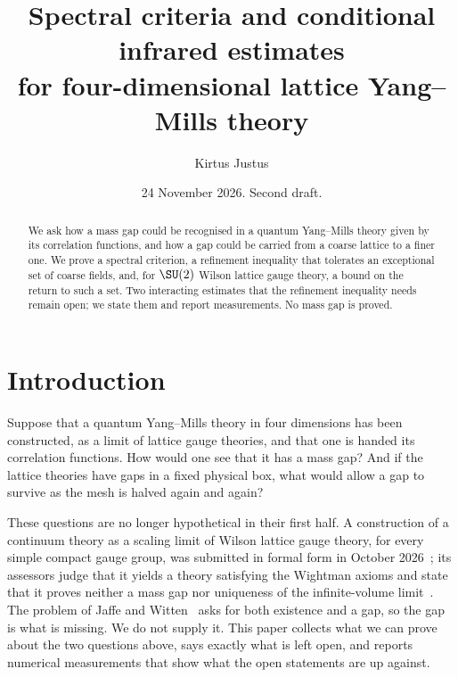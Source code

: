 
\usepackage{tikz}
\usetikzlibrary{positioning,arrows.meta}
\title[Spectral criteria and conditional infrared estimates]{Spectral criteria and conditional infrared estimates\\ for four-dimensional lattice Yang--Mills theory}
\author{Kirtus Justus}
\address{Theoretical Physicist, Port Coquitlam, British Columbia, Canada}
\date{24 November 2026. Second draft.}

\begin{abstract}
We ask how a mass gap could be recognised in a quantum Yang--Mills theory given by its correlation functions,
and how a gap could be carried from a coarse lattice to a finer one. We prove a spectral criterion, a
refinement inequality that tolerates an exceptional set of coarse fields, and, for $\SU(2)$ Wilson lattice
gauge theory, a bound on the return to such a set. Two interacting estimates that the refinement inequality
needs remain open; we state them and report measurements. No mass gap is proved.
\end{abstract}
\maketitle
\tableofcontents

\section{Introduction}\label{s:intro}

Suppose that a quantum Yang--Mills theory in four dimensions has been constructed, as a limit of lattice
gauge theories, and that one is handed its correlation functions. How would one see that it has a mass gap?
And if the lattice theories have gaps in a fixed physical box, what would allow a gap to survive as the mesh is
halved again and again?

These questions are no longer hypothetical in their first half. A construction of a continuum theory as a
scaling limit of Wilson lattice gauge theory, for every simple compact gauge group, was submitted in formal
form in October 2026~\cite{OAI}; its assessors judge that it yields a theory satisfying the Wightman axioms
and state that it proves neither a mass gap nor uniqueness of the infinite-volume limit~\cite[p.~1]{YMG}. The
problem of Jaffe and Witten~\cite[\S4]{JW} asks for both existence and a gap, so the gap is what is missing.
We do not supply it. This paper collects what we can prove about the two questions above, says exactly what
is left open, and reports numerical measurements that show what the open statements are up against.

